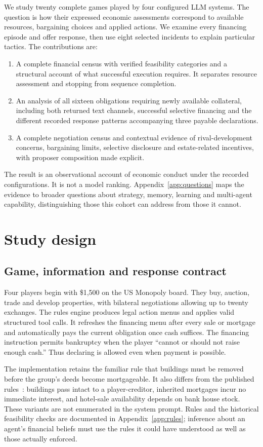 We study twenty complete games played by four configured LLM systems. The question is how their expressed economic assessments correspond to available resources, bargaining choices and applied actions. We examine every financing episode and offer response, then use eight selected incidents to explain particular tactics. The contributions are:
\begin{enumerate}
\item A complete financial census with verified feasibility categories and a structural account of what successful execution requires. It separates resource assessment and stopping from sequence completion.
\item An analysis of all sixteen obligations requiring newly available collateral, including both returned text channels, successful selective financing and the different recorded response patterns accompanying three payable declarations.
\item A complete negotiation census and contextual evidence of rival-development concerns, bargaining limits, selective disclosure and estate-related incentives, with proposer composition made explicit.
\end{enumerate}
The result is an observational account of economic conduct under the recorded configurations. It is not a model ranking. Appendix~\ref{app:questions} maps the evidence to broader questions about strategy, memory, learning and multi-agent capability, distinguishing those this cohort can address from those it cannot.

\section{Study design}
\label{sec:setup}
\subsection{Game, information and response contract}
Four players begin with \$1,500 on the US Monopoly board. They buy, auction, trade and develop properties, with bilateral negotiations allowing up to twenty exchanges. The rules engine produces legal action menus and applies valid structured tool calls. It refreshes the financing menu after every sale or mortgage and automatically pays the current obligation once cash suffices. The financing instruction permits bankruptcy when the player ``cannot or should not raise enough cash.'' Thus declaring is allowed even when payment is possible.

The implementation retains the familiar rule that buildings must be removed before the group's deeds become mortgageable. It also differs from the published rules~\cite{hasbroMonopolyRules}: buildings pass intact to a player-creditor, inherited mortgages incur no immediate interest, and hotel-sale availability depends on bank house stock. These variants are not enumerated in the system prompt. Rules and the historical feasibility checks are documented in Appendix~\ref{app:rules}; inference about an agent's financial beliefs must use the rules it could have understood as well as those actually enforced.

